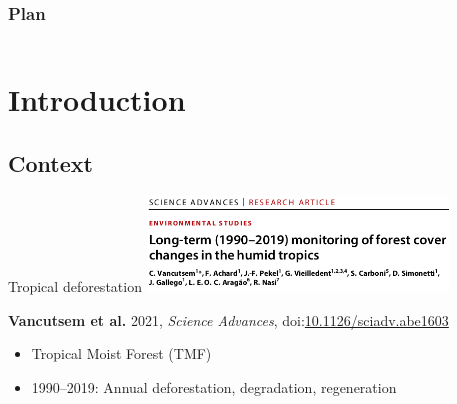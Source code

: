 \documentclass[10pt,table,dvipsnames,compress]{beamer}
\newif\ifplacelogo %
\begin{document}

\placelogotrue
\begin{frame}
  \frametitle{Plan}
  \begin{columns}[c]
    \begin{column}{0.5\textwidth}
      \tableofcontents[sections=1]
      \vspace{0.5cm}
      \tableofcontents[sections=2]
    \end{column}
    \begin{column}{0.5\textwidth}
        \tableofcontents[sections=3]
        \vspace{0.5cm}
        \tableofcontents[sections=4]
    \end{column}
  \end{columns}
\end{frame}
\placelogofalse

\section{Introduction}
\label{sec:orge4c2c94}
\subsection{Context}
\label{sec:org636b61b}
\begin{frame}[label={sec:orgedfa5a5}]{Tropical deforestation}
\centering \includegraphics[width=8cm]{figs/Vancutsem2021}

\textbf{Vancutsem et al.} 2021, \emph{Science Advances}, doi:\href{https//doi.org10.1126/sciadv.abe1603}{10.1126/sciadv.abe1603}

\begin{itemize}
\item Tropical Moist Forest (TMF)
\item 1990--2019: Annual deforestation, degradation, regeneration
\end{itemize}
\end{frame}
\end{document}

